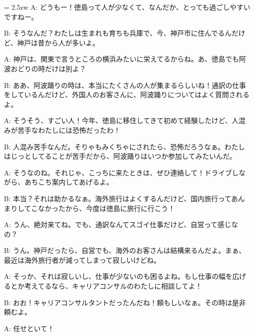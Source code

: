 \documentclass[11pt]{amsart}
\title{}
\author{}
\newenvironment{hangall}[1]{\hangindent = 2.5zw\everypar{\hangindent = 2.5zw}}{}
\begin{document}
\maketitle
\begin{hangall}{}%
A: どうもー！徳島って人が少なくて、なんだか、とっても過ごしやすいですねー。

B: そうなんだ？わたしは生まれも育ちも兵庫で、今、神戸市に住んでるんだけど、神戸は昔から人が多いよ。

A: 神戸は、関東で言うところの横浜みたいに栄えてるからね。あ、徳島でも阿波おどりの時だけは別よ？

B: ああ、阿波踊りの時は、本当にたくさんの人が集まるらしいね！通訳の仕事をしているんだけど、外国人のお客さんに、阿波踊りについてはよく質問されるよ。

A: そうそう、すごい人！今年、徳島に移住してきて初めて経験したけど、人混みが苦手なわたしには恐怖だったわ！

B: 人混み苦手なんだ。そりゃもみくちゃにされたら、恐怖だろうなぁ。わたしはじっとしてることが苦手だから、阿波踊りはいつか参加してみたいんだ。

A: そうなのね。それじゃ、こっちに来たときは、ぜひ連絡して！ドライブしながら、あちこち案内してあげるよ。

B: 本当？それは助かるなぁ。海外旅行はよくするんだけど、国内旅行ってあんまりしてこなかったから、今度は徳島に旅行に行こう！

A: うん、絶対来てね。でも、通訳なんてスゴイ仕事だけど、自営って感じなの？

B: うん。神戸だったら、自営でも、海外のお客さんは結構来るんだよ。まぁ、最近は海外旅行者が減ってしまって寂しいけどね。

A: そっか、それは寂しいし、仕事が少ないのも困るよね。もし仕事の幅を広げるとか考えてるなら、キャリアコンサルのわたしに相談してよ！

B: おお！キャリアコンサルタントだったんだね！頼もしいなぁ。その時は是非頼むよ。

A: 任せといて！
\end{hangall}
\end{document}
